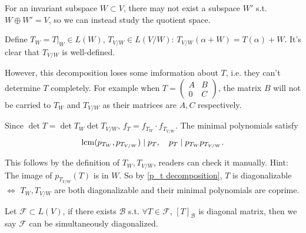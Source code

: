 For an invariant subspace $W \subset V$,
there may not exist a subspace $W'$ s.t.  $W\oplus W' = V$, so we can instead
study the quotient space.

Define $T_W = T|_W\in L(W)$, $T_{V/W}\in L(V/W)$:
$T_{V /W}(\alpha+W) = T(\alpha) + W$. It's clear that $T_{V /W}$ is well-defined.

However, this decomposition loses some imformation about $T$, i.e. they can't
determine  $T$ completely. For example when $T=\begin{pmatrix}
	A &B \\ 0 &C
\end{pmatrix}$, the matrix $B$ will not be carried to
$T_W$ and $T_{V /W}$ as their matrices are $A, C$ respectively.

Since $\det T = \det T_W \det T_{V /W}$, $f_T = f_{T_W}\cdot f_{T_{V /W}}$.
The minimal polynomials satisfy
\[\operatorname{lcm}(p_{T_W}, p_{T_{V/W}}) \mid p_T, \quad
p_T \mid p_{T_W} p_{T_{V /W}}.\]

This follows by the definition of $T_W, T_{V /W}$, readers can check it manually.
Hint: The image of $p_{T_{V /W}}(T)$ is in $W$.
So by \autoref{p_t decomposition}, $T$ is diagonalizable $\iff$ $T_W,T_{V /W}$
are both diagonalizable and their minimal polynomials are coprime.

\begin{definition}
	Let $\mathcal{F} \subset L(V)$, if there exists $\mathcal{B}$ s.t.
	$\forall T\in \mathcal{F}$, $[T]_{\mathcal{B}}$ is diagonal matrix,
	then we say $\mathcal{F}$ can be simultaneously diagonalized.
\end{definition}

